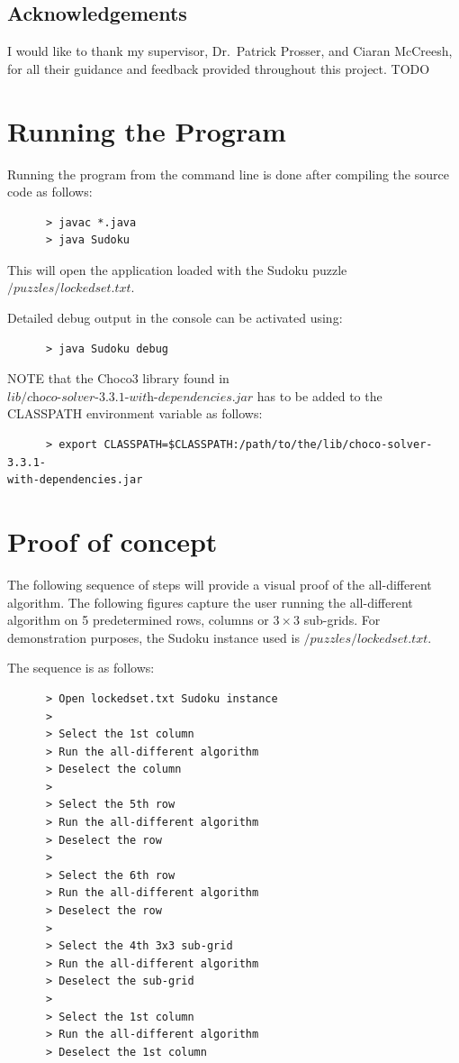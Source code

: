 \documentclass{l4proj}
\begin{document}
\section{Acknowledgements}
\noindent I would like to thank my supervisor, Dr.~Patrick Prosser, and Ciaran McCreesh, for all their guidance and feedback provided throughout this project.
\cite{crook2009pencil}
\cite{gomes2002completing}
\cite{simonis2005sudoku}
\cite{stergiou1999difference}
\cite{hopcroft1973n}
TODO


\begin{appendices}
\chapter{Running the Program}
Running the program from the command line is done after compiling the source code as follows:
\begin{verbatim}
      > javac *.java
      > java Sudoku
\end{verbatim}
This will open the application loaded with the Sudoku puzzle $\textit{/puzzles/lockedset.txt}$.

\noindent Detailed debug output in the console can be activated using:
\begin{verbatim}
      > java Sudoku debug
\end{verbatim}

\noindent NOTE that the Choco3 library found in $\textit{lib/choco-solver-3.3.1-with-dependencies.jar}$ has to be added to the CLASSPATH environment variable as follows:

\begin{verbatim}
      > export CLASSPATH=$CLASSPATH:/path/to/the/lib/choco-solver-3.3.1-
with-dependencies.jar
\end{verbatim}


\chapter{Proof of concept}

The following sequence of steps will provide a visual proof of the all-different algorithm. The following figures capture the user running the all-different algorithm on 5 predetermined rows, columns or $3\times 3$ sub-grids. For demonstration purposes, the Sudoku instance used is $/puzzles/lockedset.txt$.

\noindent The sequence is as follows:
\begin{verbatim}
      > Open lockedset.txt Sudoku instance
      >
      > Select the 1st column
      > Run the all-different algorithm
      > Deselect the column
      >
      > Select the 5th row
      > Run the all-different algorithm
      > Deselect the row
      >
      > Select the 6th row
      > Run the all-different algorithm
      > Deselect the row
      >
      > Select the 4th 3x3 sub-grid
      > Run the all-different algorithm
      > Deselect the sub-grid
      >
      > Select the 1st column
      > Run the all-different algorithm
      > Deselect the 1st column
\end{verbatim}


\end{appendices}
\end{document}

